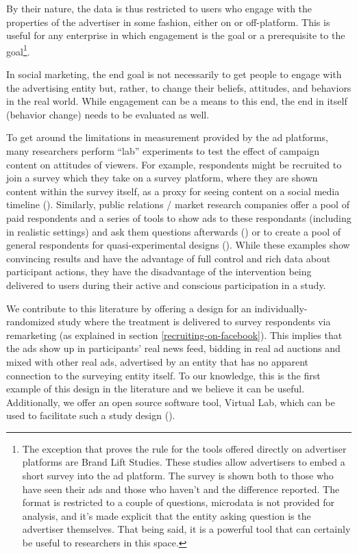 \documentclass[a4paper,12pt]{article}
\begin{document}
By their nature, the data is thus restricted to users who engage with the properties of the advertiser in some fashion, either on or off-platform. This is useful for any enterprise in which engagement is the goal or a prerequisite to the goal\footnote{The exception that proves the rule for the tools offered directly on advertiser platforms are Brand Lift Studies. These studies allow advertisers to embed a short survey into the ad platform. The survey is shown both to those who have seen their ads and those who haven't and the difference reported. The format is restricted to a couple of questions, microdata is not provided for analysis, and it's made explicit that the entity asking question is the advertiser themselves. That being said, it is a powerful tool that can certainly be useful to researchers in this space.}.

In social marketing, the end goal is not necessarily to get people to engage with the advertising entity but, rather, to change their beliefs, attitudes, and behaviors in the real world. While engagement can be a means to this end, the end in itself (behavior change) needs to be evaluated as well.

To get around the limitations in measurement provided by the ad platforms, many researchers perform ``lab'' experiments to test the effect of campaign content on attitudes of viewers. For example, respondents might be recruited to join a survey which they take on a survey platform, where they are shown content within the survey itself, as a proxy for seeing content on a social media timeline (\cite{Henry2020,Donati2020}). Similarly, public relations / market research companies offer a pool of paid respondents and a series of tools to show ads to these respondants (including in realistic settings) and ask them questions afterwards (\cite{Evans2021}) or to create a pool of general respondents for quasi-experimental designs (\cite{Sampogna2017}). While these examples show convincing results and have the advantage of full control and rich data about participant actions, they have the disadvantage of the intervention being delivered to users during their active and conscious participation in a study.

We contribute to this literature by offering a design for an individually-randomized study where the treatment is delivered to survey respondents via remarketing (as explained in section \ref{recruiting-on-facebook}). This implies that the ads show up in participants' real news feed, bidding in real ad auctions and mixed with other real ads, advertised by an entity that has no apparent connection to the surveying entity itself. To our knowledge, this is the first example of this design in the literature and we believe it can be useful. Additionally, we offer an open source software tool, Virtual Lab, which can be used to facilitate such a study design (\cite{Rao2020}).
\end{document}
